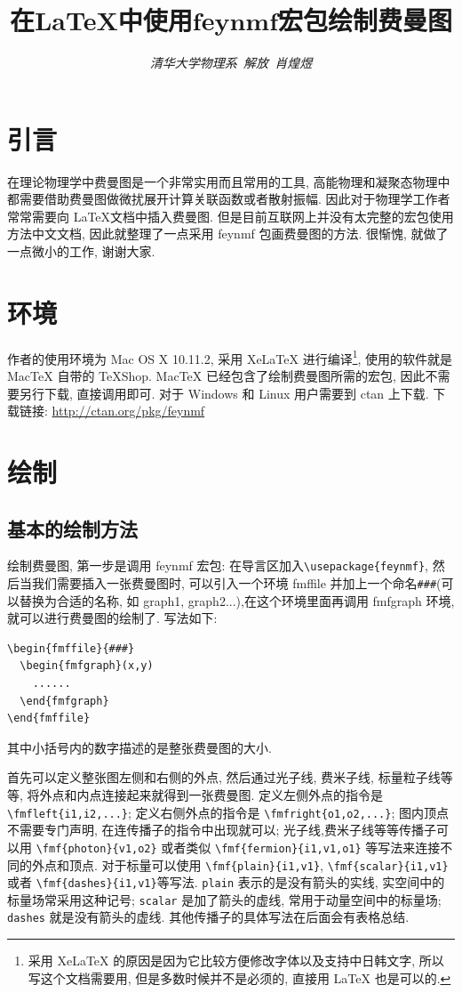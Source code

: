 \documentclass{article}
\title{\bf{在\LaTeX 中使用$\mathbf{feynmf}$宏包绘制费曼图}}
\author{\emph{清华大学物理系\, 解放\, 肖煌煜}}
\date{}
\begin{document}
\maketitle
\section{引言}
在理论物理学中费曼图是一个非常实用而且常用的工具, 高能物理和凝聚态物理中都需要借助费曼图做微扰展开计算关联函数或者散射振幅. 因此对于物理学工作者常常需要向 \LaTeX 文档中插入费曼图. 但是目前互联网上并没有太完整的宏包使用方法中文文档, 因此就整理了一点采用 feynmf 包画费曼图的方法. 很惭愧, 就做了一点微小的工作, 谢谢大家.

\section{环境}
作者的使用环境为 Mac OS X 10.11.2, 采用 XeLaTeX 进行编译\footnote{采用 XeLaTeX 的原因是因为它比较方便修改字体以及支持中日韩文字, 所以写这个文档需要用, 但是多数时候并不是必须的, 直接用 LaTeX 也是可以的.}, 使用的软件就是 MacTeX 自带的 TeXShop. MacTeX 已经包含了绘制费曼图所需的宏包, 因此不需要另行下载, 直接调用即可. 对于 Windows 和 Linux 用户需要到 ctan 上下载. 下载链接: \url{http://ctan.org/pkg/feynmf}

\section{绘制}
\subsection{基本的绘制方法}
绘制费曼图, 第一步是调用 feynmf 宏包: 在导言区加入\verb+\usepackage{feynmf}+, 然后当我们需要插入一张费曼图时, 可以引入一个环境 fmffile 并加上一个命名\verb+###+(可以替换为合适的名称, 如 graph1, graph2...),在这个环境里面再调用 fmfgraph 环境, 就可以进行费曼图的绘制了. 写法如下:
\begin{verbatim}
\begin{fmffile}{###}
  \begin{fmfgraph}(x,y)
    ......
  \end{fmfgraph}
\end{fmffile}
\end{verbatim}
其中小括号内的数字描述的是整张费曼图的大小.

首先可以定义整张图左侧和右侧的外点, 然后通过光子线, 费米子线, 标量粒子线等等, 将外点和内点连接起来就得到一张费曼图. 定义左侧外点的指令是 \verb+\fmfleft{i1,i2,...}+; 定义右侧外点的指令是 \verb+\fmfright{o1,o2,...}+; 图内顶点不需要专门声明, 在连传播子的指令中出现就可以; 光子线,费米子线等等传播子可以用 \verb+\fmf{photon}{v1,o2}+ 或者类似 \verb+\fmf{fermion}{i1,v1,o1}+ 等写法来连接不同的外点和顶点. 对于标量可以使用 \verb+\fmf{plain}{i1,v1}+, \verb+\fmf{scalar}{i1,v1}+ 或者 \verb+\fmf{dashes}{i1,v1}+等写法. \verb+plain+ 表示的是没有箭头的实线, 实空间中的标量场常采用这种记号; \verb+scalar+ 是加了箭头的虚线, 常用于动量空间中的标量场; \verb+dashes+ 就是没有箭头的虚线. 其他传播子的具体写法在后面会有表格总结. 
\end{document}
